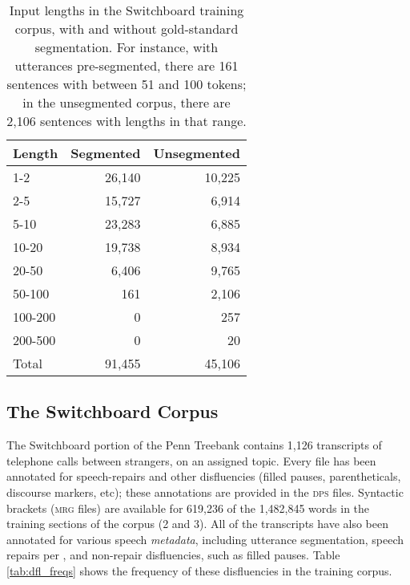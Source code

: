 \documentclass[11pt,letterpaper]{article}
\begin{document}
\begin{table}
\centering
\small
\begin{tabular}{l|rr}
    \hline
    Length & Segmented & Unsegmented \\
    \hline \hline
    1-2 & 26,140 & 10,225 \\
    2-5 & 15,727 & 6,914 \\
    5-10 & 23,283 & 6,885 \\
    10-20 & 19,738 &  8,934 \\
    20-50 & 6,406 & 9,765 \\
    50-100 & 161 & 2,106 \\
    100-200 & 0 & 257 \\
    200-500 & 0 & 20 \\
    \hline
    Total & 91,455 & 45,106 \\
    \hline
\end{tabular}
\caption{\small Input lengths in the Switchboard training corpus, with and without
    gold-standard segmentation.  For instance, with utterances pre-segmented,
    there are 161 sentences with between 51 and 100 tokens; in the unsegmented
corpus, there are 2,106 sentences with lengths in that range.
\label{tab:seg_freqs}}
\vspace*{-3em}
\end{table}

\newpage
\subsection{The Switchboard Corpus}
\label{sec:swbd}

The Switchboard portion of the Penn Treebank \citep{marcus:93} contains 1,126
transcripts of telephone calls between strangers, on an assigned topic.
Every file has been annotated for speech-repairs and other disfluencies (filled
pauses, parentheticals, discourse markers, etc); these annotations are provided
in the \textsc{dps} files.  Syntactic brackets (\textsc{mrg} files) are available
for 619,236 of the 1,482,845 words in the training sections of the corpus (2 and 3). 
All of the transcripts have also been annotated for various speech \emph{metadata},
including utterance segmentation, speech repairs per \citet{shriberg:94}, and 
non-repair disfluencies, such as filled pauses.  Table \ref{tab:dfl_freqs} shows the
frequency of these disfluencies in the training corpus.
\end{document}
